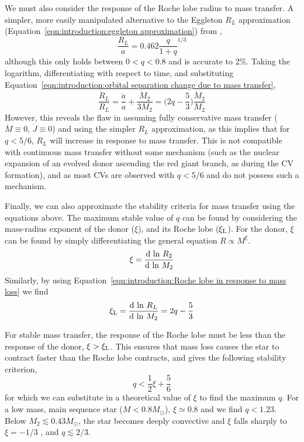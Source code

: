 We must also consider the response of the Roche lobe radius to mass transfer.
A simpler, more easily manipulated alternative to the Eggleton $R_L$ approximation (Equation~\ref{eqn:introduction:eggleton approximation}) from \citep{paczynski1971},
\begin{equation}
    \frac{R_L}{a} = 0.462 \frac{q}{1 + q}^{1/3}
\end{equation}
although this only holds between $0 < q < 0.8$ and is accurate to 2\%. Taking the logarithm, differentiating with respect to time, and substituting Equation~\ref{eqn:introduction:orbital separation change due to mass transfer},
\begin{equation}
    \label{eqn:introduction:Roche lobe in response to mass loss}
    \frac{\dot R_L}{R_L} = \frac{\dot a}{a} + \frac{\dot M_2}{3 M_2} = \bigg ( 2q - \frac{5}{3} \bigg )\frac{\dot M_2}{M_2}
\end{equation}
However, this reveals the flaw in assuming fully conservative mass transfer ($\dot M \equiv 0$, $\dot J \equiv 0$) and using the simpler $R_L$ approximation, as this implies that for $q < 5/6$, $R_L$ will increase in response to mass transfer. This is not compatible with continuous mass transfer without some mechanism (such as the nuclear expansion of an evolved donor ascending the red giant branch, as during the CV formation), and as most CVs are observed with $q < 5/6$ and do not possess such a mechanism. 

Finally, we can also approximate the stability criteria for mass transfer using the equations above. 
The maximum stable value of $q$ can be found by considering the mass-radius exponent of the donor ($\xi$), and its Roche lobe ($\xi_{\rm L}$). For the donor, $\xi$ can be found by simply differentiating the general equation $R \propto M^\xi$.
\begin{equation}
    \xi = \frac{{\rm d\ ln\ }R_2}{{\rm d\ ln\ }M_2}
\end{equation}
Similarly, by using Equation~\ref{eqn:introduction:Roche lobe in response to mass loss} we find
\begin{equation}
    \xi_{\rm L} = \frac{{\rm d\ ln\ }R_L}{{\rm d\ ln\ }M_2} = 2q - \frac{5}{3}
\end{equation}

For stable mass transfer, the response of the Roche lobe must be less than the response of the donor, $\xi > \xi_{\rm L}$. This ensures that mass loss causes the star to contract faster than the Roche lobe contracts, and gives the following stability criterion,
\begin{equation}
    q < \frac{1}{2}\xi + \frac{5}{6}
\end{equation}
for which we can substitute in a theoretical value of $\xi$ to find the maximum $q$. For a low mass, main sequence star ($M < 0.8M_\odot$), $\xi \simeq 0.8$ \citep{knigge11} and we find $q < 1.23$. Below $M_2 \lesssim 0.43 M_\odot$, the star becomes deeply convective and $\xi$ falls sharply to $\xi = -1/3$ \citep{paczynski1965,rappaport1982}, and $q \lesssim 2/3$. 


